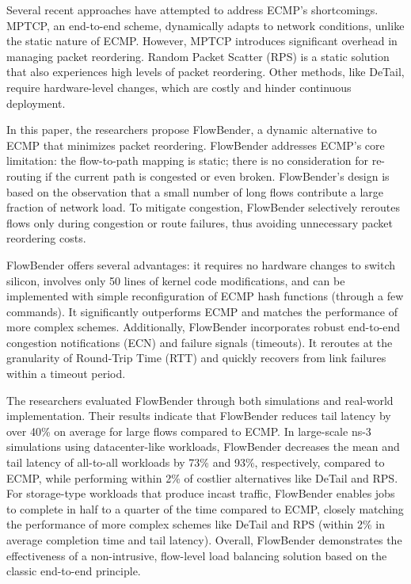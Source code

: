 \documentclass[11pt, sigconf]{acmart}
\begin{document}
Several recent approaches have attempted to address ECMP's shortcomings. MPTCP, an end-to-end scheme, dynamically adapts to network conditions, unlike the static nature of ECMP. However, MPTCP introduces significant overhead in managing packet reordering. Random Packet Scatter (RPS) is a static solution that also experiences high levels of packet reordering. Other methods, like DeTail, require hardware-level changes, which are costly and hinder continuous deployment.

In this paper, the researchers propose FlowBender, a dynamic alternative to ECMP that minimizes packet reordering. FlowBender addresses ECMP's core limitation: the flow-to-path mapping is static; there is no consideration for re-routing if the current path is congested or even broken. FlowBender’s design is based on the observation that a small number of long flows contribute a large fraction of network load. To mitigate congestion, FlowBender selectively reroutes flows only during congestion or route failures, thus avoiding unnecessary packet reordering costs.

FlowBender offers several advantages: it requires no hardware changes to switch silicon, involves only 50 lines of kernel code modifications, and can be implemented with simple reconfiguration of ECMP hash functions (through a few commands). It significantly outperforms ECMP and matches the performance of more complex schemes. Additionally, FlowBender incorporates robust end-to-end congestion notifications (ECN) and failure signals (timeouts). It reroutes at the granularity of Round-Trip Time (RTT) and quickly recovers from link failures within a timeout period.

The researchers evaluated FlowBender through both simulations and real-world implementation. Their results indicate that FlowBender reduces tail latency by over 40\% on average for large flows compared to ECMP. In large-scale ns-3 simulations using datacenter-like workloads, FlowBender decreases the mean and tail latency of all-to-all workloads by 73\% and 93\%, respectively, compared to ECMP, while performing within 2\% of costlier alternatives like DeTail and RPS. For storage-type workloads that produce incast traffic, FlowBender enables jobs to complete in half to a quarter of the time compared to ECMP, closely matching the performance of more complex schemes like DeTail and RPS (within 2\% in average completion time and tail latency). Overall, FlowBender demonstrates the effectiveness of a non-intrusive, flow-level load balancing solution based on the classic end-to-end principle.
\end{document}
